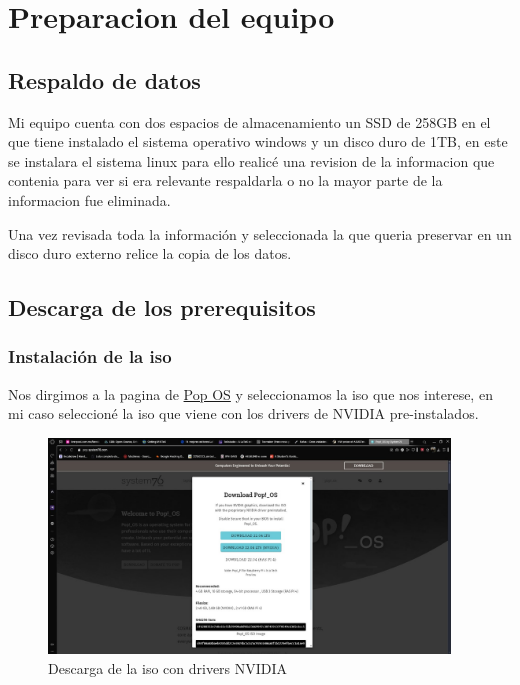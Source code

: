 \section{Preparacion del equipo}

\subsection{Respaldo de datos}

Mi equipo cuenta con dos espacios de almacenamiento un SSD de 258GB en el que tiene instalado el sistema operativo windows y un disco duro de 1TB, en este se instalara el sistema linux para ello realicé una revision de la informacion que contenia para ver si era relevante respaldarla o no la mayor parte de la informacion fue eliminada. 

Una vez revisada toda la información y seleccionada la que queria preservar en un disco duro externo relice la copia de los datos.

\subsection{Descarga de los prerequisitos}

\subsubsection{Instalación de la iso}
Nos dirgimos a la pagina de \href{https://pop.system76.com/}{Pop OS} y seleccionamos la iso que nos interese, en mi caso seleccioné la iso que viene con los drivers de NVIDIA pre-instalados.

\begin{figure}[h]
  \begin{center}
    \includegraphics[width=0.95\textwidth]{img/download_popos.jpeg}
  \end{center}
  \caption{Descarga de la iso con drivers NVIDIA}\label{fig:download_popos}
\end{figure}


